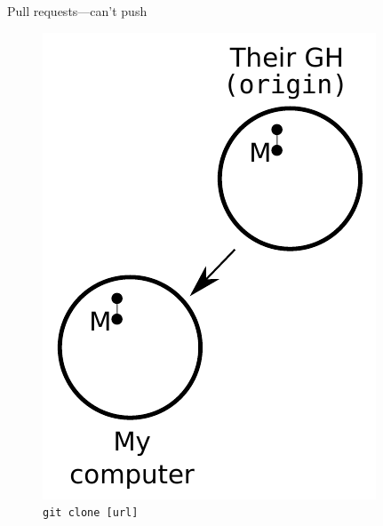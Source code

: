 \begin{frame}{Pull requests---can't push}
  \begin{figure}
    \includegraphics{fork_002.pdf}
    \\ \texttt{git clone [url]}
    \\ \texttt{}
  \end{figure}
\end{frame}

